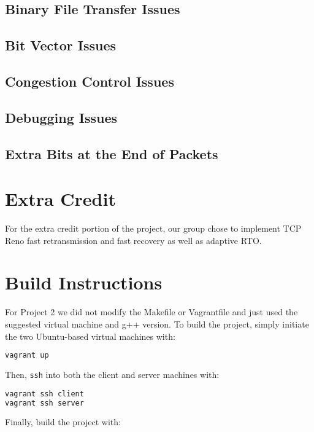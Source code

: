 \documentclass{article}
\begin{document}
\subsection{Binary File Transfer Issues}

\subsection{Bit Vector Issues}

\subsection{Congestion Control Issues}

\subsection{Debugging Issues}

\subsection{Extra Bits at the End of Packets}

\section{Extra Credit}

For the extra credit portion of the project, our group chose to implement TCP Reno fast retransmission and fast recovery as well as adaptive RTO.

\section{Build Instructions}

For Project 2 we did not modify the Makefile or Vagrantfile and just used the suggested virtual machine and g++ version. To build the project, simply initiate the two Ubuntu-based virtual machines with:

\begin{lstlisting}[language=bash]
vagrant up
\end{lstlisting} 

\noindent
Then, \texttt{ssh} into both the client and server machines with:

\begin{lstlisting}[language=bash]
vagrant ssh client
vagrant ssh server
\end{lstlisting} 

\noindent
Finally, build the project with:
\end{document}
